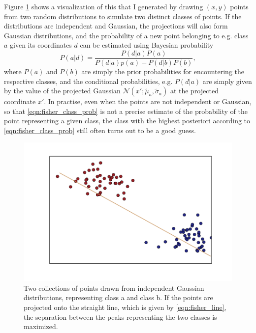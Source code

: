 Figure \ref{fig:fisher_example} shows a visualization of this that I generated by drawing $(x,y)$ points from two random distributions to simulate two distinct classes of points. If the distributions are independent and Gaussian, the projections will also form Gaussian distributions, and the probability of a new point belonging to e.g. class $a$ given its coordinates $d$ can be estimated using Bayesian probability
\begin{equation}
	P(a|d) = \frac{P(d|a)P(a)}{P(d|a)p(a)+P(d|b)P(b)}, \label{eqn:fisher_class_prob}
\end{equation}
where $P(a)$ and $P(b)$ are simply the prior probabilities for encountering the respective classes, and the conditional probabilities, e.g. $P(d|a)$ are simply given by the value of the projected Gaussian $\mathcal{N}(x';\widetilde{\mu}_a, \widetilde{\sigma}_a)$ at the projected coordinate $x'$. In practise, even when the points are not independent or Gaussian, so that \eqref{eqn:fisher_class_prob} is not a precise estimate of the probability of the point representing a given class, the class with the highest posteriori according to \eqref{eqn:fisher_class_prob} still often turns out to be a good guess.

\begin{figure}
	\centering
	\includegraphics[width = \figwidth]{pics/ml/fisher_example.pdf}
	\caption{Two collections of points drawn from independent Gaussian distributions, representing {\color{moerkeroed} class a} and {\color{oldhat} class b}. If the points are projected onto the {\color{nude} straight line}, which is given by \eqref{eqn:fisher_line}, the separation between the peaks representing the two classes is maximized.}
	\label{fig:fisher_example}
\end{figure}

